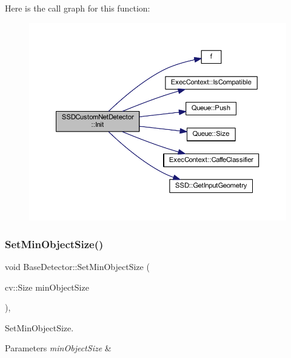 Here is the call graph for this function\+:\nopagebreak
\begin{figure}[H]
\begin{center}
\leavevmode
\includegraphics[width=350pt]{class_s_s_d_custom_net_detector_a2f228b0c7bbd679ff310158de119169b_cgraph}
\end{center}
\end{figure}
\mbox{\label{class_base_detector_ab459f4e77cf1110cc1ee84027f0f2a03}} 
\subsubsection{\texorpdfstring{Set\+Min\+Object\+Size()}{SetMinObjectSize()}}
{\footnotesize\ttfamily void Base\+Detector\+::\+Set\+Min\+Object\+Size (\begin{DoxyParamCaption}\item[{cv\+::\+Size}]{min\+Object\+Size }\end{DoxyParamCaption})\hspace{0.3cm}{\ttfamily [inline]}, {\ttfamily [inherited]}}



Set\+Min\+Object\+Size. 


\begin{DoxyParams}{Parameters}
{\em min\+Object\+Size} & \\
\hline
\end{DoxyParams}


